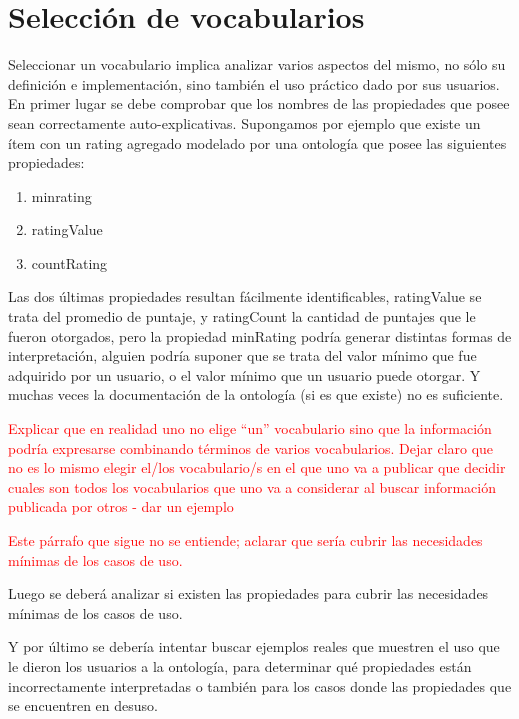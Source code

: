 \section{Selección de vocabularios}

Seleccionar un vocabulario implica analizar varios aspectos del mismo, no sólo su definición e implementación, sino también el uso práctico dado por sus usuarios. 
En primer lugar se debe comprobar que los nombres de las propiedades que posee sean correctamente auto-explicativas. Supongamos por ejemplo que existe un ítem con un rating agregado modelado por una ontología que posee las siguientes propiedades:

\begin{enumerate}
\item minrating
\item ratingValue
\item countRating
\end{enumerate}


Las dos últimas propiedades resultan fácilmente identificables, ratingValue se trata del promedio de puntaje, y ratingCount 
la cantidad de puntajes que le fueron otorgados, pero la propiedad minRating podría generar distintas formas de interpretación, 
alguien podría suponer que se trata del valor mínimo que fue adquirido por un usuario, o el valor mínimo que un usuario puede 
otorgar. Y muchas veces la documentación de la ontología (si es que existe) no es suficiente.

\begin{framed}
\textcolor{red}{Explicar que en realidad uno no elige ``un'' vocabulario sino que la información podría expresarse combinando términos de varios vocabularios. Dejar claro que no es lo mismo elegir el/los vocabulario/s en el que uno va a publicar que decidir cuales son todos los vocabularios que uno va a considerar al buscar información publicada por otros - dar un ejemplo}
\end{framed}

\begin{framed}
\textcolor{red}{Este párrafo que sigue no se entiende; aclarar que sería cubrir las necesidades mínimas de los casos de uso.}
\end{framed}
Luego se deberá analizar si existen las propiedades para cubrir las necesidades mínimas de los casos de uso.


Y por último se debería intentar buscar ejemplos reales que muestren el uso que le dieron los usuarios a la ontología, para 
determinar qué propiedades están incorrectamente interpretadas o también para los casos donde las propiedades que se encuentren 
en desuso.

